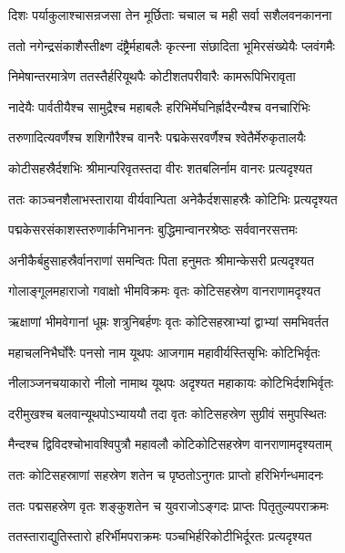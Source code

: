 \twolineshloka
{दिशः पर्याकुलाश्चासन्रजसा तेन मूर्छिताः}
{चचाल च मही सर्वा सशैलवनकानना} %

\twolineshloka
{ततो नगेन्द्रसंकाशैस्तीक्ष्ण दंष्ट्रैर्महाबलैः}
{कृत्स्ना संछादिता भूमिरसंख्येयैः प्लवंगमैः} %

\twolineshloka
{निमेषान्तरमात्रेण ततस्तैर्हरियूथपैः}
{कोटीशतपरीवारैः कामरूपिभिरावृता} %

\twolineshloka
{नादेयैः पार्वतीयैश्च सामुद्रैश्च महाबलैः}
{हरिभिर्मेघनिर्ह्रादैरन्यैश्च वनचारिभिः} %

\twolineshloka
{तरुणादित्यवर्णैश्च शशिगौरैश्च वानरैः}
{पद्मकेसरवर्णैश्च श्वेतैर्मेरुकृतालयैः} %

\twolineshloka
{कोटीसहस्रैर्दशभिः श्रीमान्परिवृतस्तदा}
{वीरः शतबलिर्नाम वानरः प्रत्यदृश्यत} %

\twolineshloka
{ततः काञ्चनशैलाभस्ताराया वीर्यवान्पिता}
{अनेकैर्दशसाहस्रैः कोटिभिः प्रत्यदृश्यत} %

\twolineshloka
{पद्मकेसरसंकाशस्तरुणार्कनिभाननः}
{बुद्धिमान्वानरश्रेष्ठः सर्ववानरसत्तमः} %

\twolineshloka
{अनीकैर्बहुसाहस्रैर्वानराणां समन्वितः}
{पिता हनुमतः श्रीमान्केसरी प्रत्यदृश्यत} %

\twolineshloka
{गोलाङ्गूलमहाराजो गवाक्षो भीमविक्रमः}
{वृतः कोटिसहस्रेण वानराणामदृश्यत} %

\twolineshloka
{ऋक्षाणां भीमवेगानां धूम्रः शत्रुनिबर्हणः}
{वृतः कोटिसहस्राभ्यां द्वाभ्यां समभिवर्तत} %

\twolineshloka
{महाचलनिभैर्घोरैः पनसो नाम यूथपः}
{आजगाम महावीर्यस्तिसृभिः कोटिभिर्वृतः} %

\twolineshloka
{नीलाञ्जनचयाकारो नीलो नामाथ यूथपः}
{अदृश्यत महाकायः कोटिभिर्दशभिर्वृतः} %

\twolineshloka
{दरीमुखश्च बलवान्यूथपोऽभ्याययौ तदा}
{वृतः कोटिसहस्रेण सुग्रीवं समुपस्थितः} %

\twolineshloka
{मैन्दश्च द्विविदश्चोभावश्विपुत्रौ महावलौ}
{कोटिकोटिसहस्रेण वानराणामदृश्यताम्} %

\twolineshloka
{ततः कोटिसहस्राणां सहस्रेण शतेन च}
{पृष्ठतोऽनुगतः प्राप्तो हरिभिर्गन्धमादनः} %

\twolineshloka
{ततः पद्मसहस्रेण वृतः शङ्कुशतेन च}
{युवराजोऽङ्गदः प्राप्तः पितृतुल्यपराक्रमः} %

\twolineshloka
{ततस्ताराद्युतिस्तारो हरिर्भीमपराक्रमः}
{पञ्चभिर्हरिकोटीभिर्दूरतः प्रत्यदृश्यत} %

